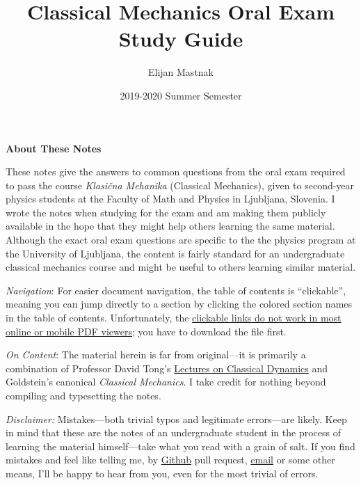 \documentclass[11pt, a4paper]{article}
\begin{document}
\title{Classical Mechanics Oral Exam Study Guide}
\author{Elijan Mastnak}
\date{2019-2020 Summer Semester}
\maketitle

\begin{center}
\textbf{About These Notes}
\end{center}
These notes give the answers to common questions from the oral exam required to pass the course \textit{Klasi\v{c}na Mehanika} (Classical Mechanics), given to second-year physics students at the Faculty of Math and Physics in Ljubljana, Slovenia. I wrote the notes when studying for the exam and am making them publicly available in the hope that they might help others learning the same material. Although the exact oral exam questions are specific to the the physics program at the University of Ljubljana, the content is fairly standard for an undergraduate classical mechanics course and might be useful to others learning similar material.

\vspace{2mm}
\textit{Navigation}: For easier document navigation, the table of contents is ``clickable'', meaning you can jump directly to a section by clicking the colored section names in the table of contents. Unfortunately, the \uline{clickable links do not work in most online or mobile PDF viewers}; you have to download the file first.

\vspace{2mm}
\textit{On Content}: The material herein is far from original---it is primarily a combination of Professor David Tong's \href{http://www.damtp.cam.ac.uk/user/tong/dynamics.html}{Lectures on Classical Dynamics} and Goldstein's canonical \textit{Classical Mechanics}. I take credit for nothing beyond compiling and typesetting the notes.

\vspace{2mm}
\textit{Disclaimer:} Mistakes---both trivial typos and legitimate errors---are likely. Keep in mind that these are the notes of an undergraduate student in the process of learning the material himself---take what you read with a grain of salt. If you find mistakes and feel like telling me, by \href{https://github.com/ejmastnak/fmf}{Github} pull request, \href{mailto:ejmastnak@gmail.com}{email} or some other means, I'll be happy to hear from you, even for the most trivial of errors.
\end{document}
